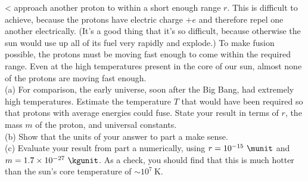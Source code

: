 <%
approach another proton to within a short enough range $r$. This is difficult to achieve, because the protons
have electric charge $+e$ and
therefore repel one another electrically. (It's a good thing that it's so difficult, because otherwise the sun would use up
all of its fuel very rapidly and explode.) To make fusion possible, the protons must be moving fast enough to come
within the required range. Even at the high temperatures present in the core of our sun, almost none of the protons
are moving fast enough.\\
(a) For comparison, the early universe, soon after the Big Bang, had extremely high temperatures. Estimate the
temperature $T$ that would have been required so that protons with average energies could fuse. State your result
in terms of $r$, the mass $m$ of the proton, and universal constants.\\
(b) Show that the units of your answer to part a make sense.\\
(c) Evaluate your result from part a numerically, using $r=10^{-15}\ \munit$ and
$m=1.7\times10^{-27}\ \kgunit$. As a check, you should find that this is much hotter than the
sun's core temperature of $\sim10^7\ \text{K}$.
